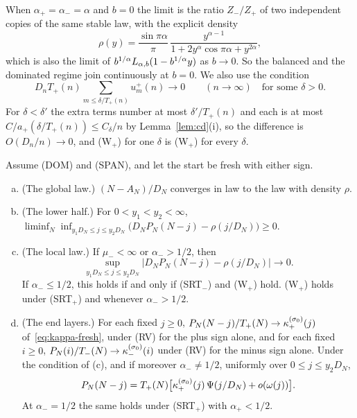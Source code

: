 When $\alpha_\plus=\alpha_\minus=\alpha$ and $b=0$ the limit is the ratio $Z_\minus/Z_\plus$ of two
independent copies of the same stable law, with the explicit density
\begin{equation}\label{eq:ratio-density}
 \rho(y)=\frac{\sin\pi\alpha}\pi\,\frac{y^{\alpha-1}}{1+2y^\alpha\cos\pi\alpha+y^{2\alpha}},
\end{equation}
which is also the limit of $b^{1/\alpha}L_{\alpha,b}(1-b^{1/\alpha}y)$ as $b\to0$. So the balanced and
the dominated regime join continuously at $b=0$. We also use the condition
\begin{equation}\label{eq:W}\tag{W$_\plus$}
 D_nT_\plus(n)\sum_{m\le\delta/T_\plus(n)}u^\plus_m(n)\to0\qquad(n\to\infty)\quad\text{for some }\delta>0 .
\end{equation}
For $\delta<\delta'$ the extra terms number at most $\delta'/T_\plus(n)$ and each is at most
$C/a_\plus(\delta/T_\plus(n))\le C_\delta/n$ by Lemma~\ref{lem:cd}(i), so the difference is
$O(D_n/n)\to0$, and (W$_\plus$) for one $\delta$ is (W$_\plus$) for every $\delta$.

\begin{introtheorem}\label{thm:dominated}
Assume (DOM) and (SPAN), and let the start be fresh with either sign.
\begin{enumerate}[(a)]
\item (The global law.) $(N-A_N)/D_N$ converges in law to the law with density $\rho$.
\item (The lower half.) For $0<y_1<y_2<\infty$,
$\liminf_N\inf_{y_1D_N\le j\le y_2D_N}\bigl(D_NP_N(N-j)-\rho(j/D_N)\bigr)\ge0$.
\item (The local law.) If $\mu_\minus<\infty$ or $\alpha_\minus>1/2$, then
\[
 \sup_{y_1D_N\le j\le y_2D_N}\bigl|D_NP_N(N-j)-\rho(j/D_N)\bigr|\to0 .
\]
If $\alpha_\minus\le1/2$, this holds if and only if (SRT$_\minus$) and (W$_\plus$) hold.
(W$_\plus$) holds under (SRT$_\plus$) and whenever $\alpha_\minus>1/2$.
\item (The end layers.) For each fixed $j\ge0$, $P_N(N-j)/T_{+}(N)\to\kappa^{(\sigma_0)}_{+}(j)$
of~\eqref{eq:kappa-fresh}, under (RV) for the plus sign alone, and for each fixed $i\ge0$,
$P_N(i)/T_{-}(N)\to\kappa^{(\sigma_0)}_{-}(i)$ under (RV) for the minus sign alone. Under the
condition of (c), and if moreover $\alpha_\minus\ne1/2$, uniformly over $0\le j\le y_2D_N$,
\[
 P_N(N-j)=T_{+}(N)\bigl[\kappa^{(\sigma_0)}_{+}(j)\,\Psi(j/D_N)+o(\omega(j))\bigr].
\]
At $\alpha_\minus=1/2$ the same holds under (SRT$_\plus$) with $\alpha_\plus<1/2$.
\end{enumerate}
\end{introtheorem}

